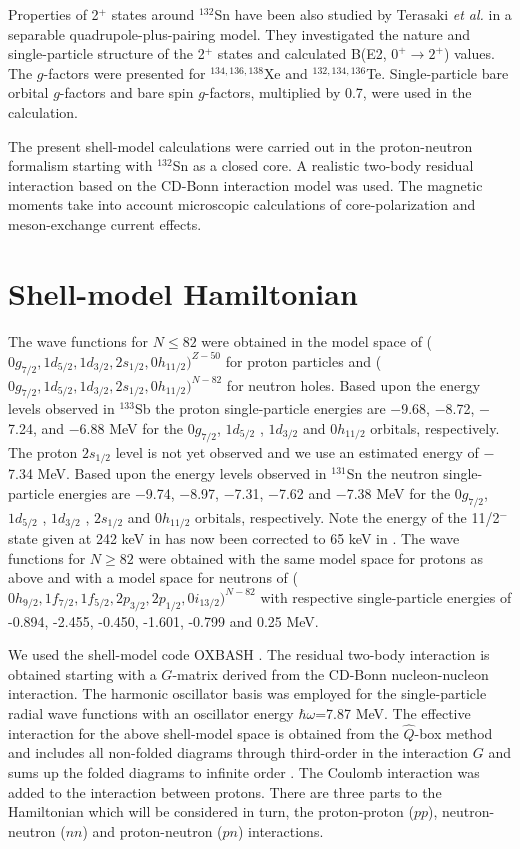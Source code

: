 \documentclass[aps,twocolumn,superscriptaddress,prc,showpacs]{revtex4}
\begin{document}
Properties of 2$^+$ states around $^{132}$Sn have been also studied by Terasaki {\em et al.} \cite{ter02}  
in a separable quadrupole-plus-pairing model. They investigated the nature and
single-particle structure of the 2$^+$ states and calculated B(E2, $0^+ \rightarrow 2^+$) values.
The $g$-factors were presented for $^{134,136,138}$Xe and $^{132,134,136}$Te.    
Single-particle bare orbital $g$-factors and bare spin $g$-factors,
multiplied by 0.7, were used in the calculation.

The present shell-model calculations  were carried out in the proton-neutron   
formalism starting with $^{132}$Sn as a closed core.
A realistic two-body residual interaction based on the CD-Bonn interaction model  \cite{cdbonn} 
was used. The magnetic moments take into account microscopic calculations
of core-polarization and meson-exchange current effects.


\section{Shell-model Hamiltonian}

The wave functions for $N \leq 82$ were
obtained in the model space of
($  0g_{7/2},1d_{5/2},1d_{3/2},2s_{1/2},0h_{11/2})^{Z-50}  $ for
proton particles and
($  0g_{7/2},1d_{5/2},1d_{3/2},2s_{1/2},0h_{11/2})^{N-82}  $ for
neutron holes.
Based upon
the energy levels observed in $^{133}$Sb \cite{San98}
the proton single-particle energies are $-$9.68, $-$8.72, $-$7.24,
 and $-$6.88 MeV for the
$  0g_{7/2}  $, $ 1d_{5/2} $ ,  $ 1d_{3/2} $    and
$  0h_{11/2}  $
orbitals, respectively. The proton $  2s_{1/2}  $ level
is not yet observed and we use an estimated energy of
$-$7.34 MeV.
Based upon
the energy levels observed in $^{131}$Sn \cite{Fire,fogel}
the neutron single-particle energies are $-$9.74, $-$8.97, $-$7.31,
$-$7.62  and $-$7.38 MeV for the
$  0g_{7/2}  $, $ 1d_{5/2} $  ,   $ 1d_{3/2} $ ,   $ 2s_{1/2} $   and
 $  0h_{11/2}  $
orbitals, respectively. Note the energy of the 11/2$^-$ state
given at 242 keV in \cite{Fire} has now been corrected to 65 keV
in \cite{fogel}.
The wave functions for $N \geq 82$ were
obtained with the same model space for protons as above and with a model
space for neutrons of
($  0h_{9/2},1f_{7/2},1f_{5/2},2p_{3/2},2p_{1/2},0i_{13/2})^{N-82}  $
with respective single-particle energies of -0.894, -2.455, -0.450,
-1.601, -0.799 and 0.25 MeV.

We used the shell-model code OXBASH \cite{OXBASH}.
The residual two-body interaction is obtained starting with a
$  G  $-matrix derived from the CD-Bonn \cite{cdbonn} nucleon-nucleon
interaction. The harmonic oscillator
basis was employed for the single-particle radial wave functions with an
oscillator energy $\hbar\omega$=7.87 MeV. The effective interaction
for the above shell-model space is obtained from
the $  \hat{Q}  $-box method and
includes all non-folded diagrams through third-order in the
interaction $  G  $ and sums up the folded diagrams to infinite
order \cite{hko95}. The Coulomb interaction was added to
the interaction between protons.
There are three parts to the Hamiltonian which will be considered
in turn, the proton-proton ($  pp  $),
neutron-neutron ($  nn  $) and proton-neutron ($  pn  $)
interactions.
\end{document}
